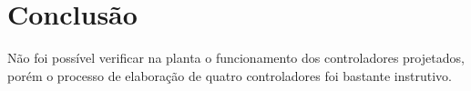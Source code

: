 \documentclass{article}
\begin{document}
\section{Conclusão}
{
    Não foi possível verificar na planta o funcionamento dos controladores projetados, porém o processo de elaboração de quatro controladores foi bastante instrutivo.
}

\end{document}
